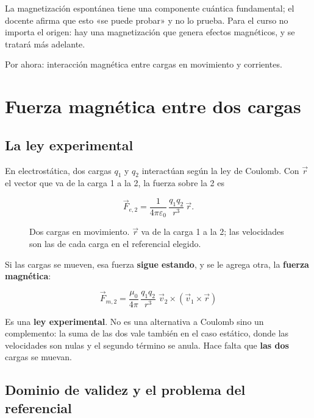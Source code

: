 \documentclass[12pt,a4paper]{article}
\begin{document}
\begin{notebox}
La magnetización
espontánea tiene una componente cuántica fundamental; el docente afirma que
esto «se puede probar» y no lo prueba. Para el curso no importa el origen:
hay una magnetización que genera efectos magnéticos, y se tratará más
adelante.
\end{notebox}

Por ahora: interacción magnética entre cargas en movimiento y corrientes.

\section{Fuerza magnética entre dos cargas}

\subsection{La ley experimental}

En electrostática, dos cargas $q_1$ y $q_2$ interactúan según la ley de
Coulomb. Con $\vec r$ el vector que va de la carga 1 a la 2, la fuerza sobre
la 2 es

\[
\vec F_{e,2} = \frac{1}{4\pi\varepsilon_0}\,\frac{q_1 q_2}{r^3}\,\vec r .
\]

\begin{figure}[H]
  \centering
  
  \caption{Dos cargas en movimiento. $\vec r$ va de la carga 1 a la 2; las velocidades son las de cada carga en el referencial elegido.}
\end{figure}

Si las cargas se mueven, esa fuerza \textbf{sigue estando}, y se le agrega otra, la
\textbf{fuerza magnética}:

\begin{keybox}
\[
\boxed{\ \vec F_{m,2} = \frac{\mu_0}{4\pi}\,\frac{q_1 q_2}{r^3}\;
\vec v_2\times\left(\vec v_1\times\vec r\right)\ }
\]
\end{keybox}

Es una \textbf{ley experimental}. No es una alternativa a Coulomb sino un
complemento: la suma de las dos vale también en el caso estático, donde las
velocidades son nulas y el segundo término se anula. Hace falta que \textbf{las dos}
cargas se muevan.

\subsection{Dominio de validez y el problema del referencial}
\end{document}
